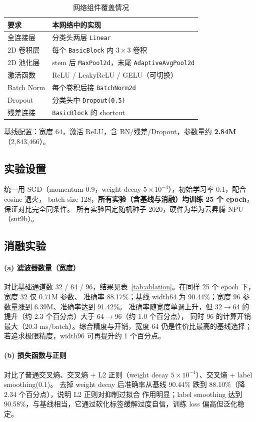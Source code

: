 \documentclass[11pt]{ctexart}
\begin{document}
\begin{table}[h]
\centering
\caption{网络组件覆盖情况}
\label{tab:components}
\begin{tabular}{ll}
\toprule
要求 & 本网络中的实现 \\
\midrule
全连接层 & 分类头两层 \texttt{Linear} \\
2D 卷积层 & 每个 \texttt{BasicBlock} 内 $3\times3$ 卷积 \\
2D 池化层 & stem 后 \texttt{MaxPool2d}，末尾 \texttt{AdaptiveAvgPool2d} \\
激活函数 & ReLU / LeakyReLU / GELU（可切换） \\
Batch Norm & 每个卷积后接 \texttt{BatchNorm2d} \\
Dropout & 分类头中 \texttt{Dropout(0.5)} \\
残差连接 & \texttt{BasicBlock} 的 shortcut \\
\bottomrule
\end{tabular}
\end{table}

基线配置：宽度 64，激活 ReLU，含 BN/残差/Dropout，参数量约 \textbf{2.84M}（2{,}843{,}466）。

\subsection{实验设置}
统一用 SGD（momentum 0.9，weight decay $5\times10^{-4}$），初始学习率 0.1，配合 cosine 退火，
batch size 128，\textbf{所有实验（含基线与消融）均训练 25 个 epoch}，保证对比完全同条件。
所有实验固定随机种子 2020，硬件为华为云昇腾 NPU（snt9b）。

\subsection{消融实验}

\paragraph{(a) 滤波器数量（宽度）}
对比基础通道数 32 / 64 / 96，结果见表~\ref{tab:ablation}。在同样 25 个 epoch 下，宽度 32 仅 0.71M 参数、
准确率 88.17\%；基线 width64 为 90.44\%；宽度 96 参数量涨到 6.39M、准确率达到 91.42\%。
准确率随宽度单调上升，但 32$\to$64 的提升（约 2.3 个百分点）大于 64$\to$96（约 1.0 个百分点），
同时 96 的计算开销最大（20.3 ms/batch）。综合精度与开销，宽度 64 仍是性价比最高的基线选择；
若追求极限精度，width96 可再提升约 1 个百分点。

\paragraph{(b) 损失函数与正则}
对比了普通交叉熵、交叉熵 + L2 正则（weight decay $5\times10^{-4}$）、交叉熵 + label smoothing(0.1)。
去掉 weight decay 后准确率从基线 90.44\% 跌到 88.10\%（降 2.34 个百分点），说明 L2 正则对抑制过拟合
作用明显；label smoothing 达到 90.58\%，与基线相当，它通过软化标签缓解过度自信，训练 loss 偏高但泛化稳定。
\end{document}
